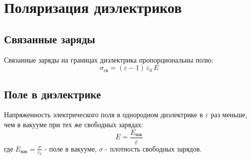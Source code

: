 \documentclass{article}
\begin{document}
\section*{Поляризация диэлектриков}

\subsection*{Связанные заряды}
Связанные заряды на границах диэлектрика пропорциональны полю:
\[
\sigma_{\text{св}} = (\varepsilon-1)\,\varepsilon_0\,E
\]

\subsection*{Поле в диэлектрике}
Напряженность электрического поля в однородном диэлектрике в $\varepsilon$ раз меньше, чем в вакууме при тех же свободных зарядах:
\[
E=\frac{E_{\text{вак}}}{\varepsilon}
\]
где $E_{\text{вак}}=\frac{\sigma}{\varepsilon_0}$ - поле в вакууме, $\sigma$ - плотность свободных зарядов.
\end{document}
